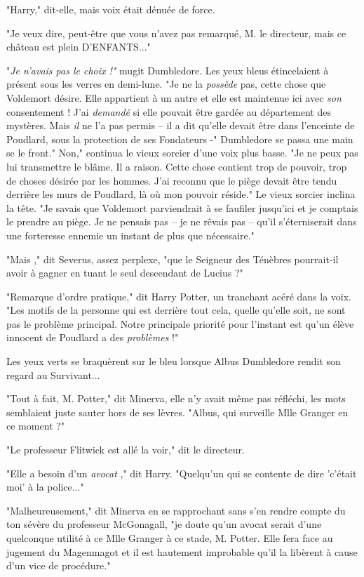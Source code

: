 "Harry," dit-elle, mais voix était dénuée de force.

"Je veux dire, peut-être que vous n'avez pas remarqué, M. le directeur, mais ce château est plein D'ENFANTS..."

"\emph{Je n'avais pas le choix !"}  mugit Dumbledore. Les yeux bleus étincelaient à présent sous les verres en demi-lune. "Je ne la \emph{possède}  pas, cette chose que Voldemort désire. Elle appartient à un autre et elle est maintenue ici avec \emph{son}  consentement ! J'ai \emph{demandé}  si elle pouvait être gardée au département des mystères. Mais \emph{il}  ne l'a pas permis – il a dit qu'elle devait être dans l'enceinte de Poudlard, sous la protection de ses Fondateurs -" Dumbledore se passa une main se le front." Non," continua le vieux sorcier d'une voix plus basse. "Je ne peux pas lui transmettre le blâme. Il a raison. Cette chose contient trop de pouvoir, trop de choses désirée par les hommes. J'ai reconnu que le piège devait être tendu derrière les murs de Poudlard, là où mon pouvoir réside." Le vieux sorcier inclina la tête. "Je savais que Voldemort parviendrait à se faufiler jusqu'ici et je comptais le prendre au piège. Je ne pensais pas – je ne rêvais pas – qu'il s'éterniserait dans une forteresse ennemie un instant de plus que nécessaire."

"Mais ," dit Severus, assez perplexe, "que le Seigneur des Ténèbres pourrait-il avoir à gagner en tuant le seul descendant de Lucius ?"

"Remarque d'ordre pratique," dit Harry Potter, un tranchant acéré dans la voix. "Les motifs de la personne qui est derrière tout cela, quelle qu'elle soit, ne sont pas le problème principal. Notre principale priorité pour l'instant est qu'un élève innocent de Poudlard a des \emph{problèmes } !"

Les yeux verts se braquèrent sur le bleu lorsque Albus Dumbledore rendit son regard au Survivant...

"Tout à fait, M. Potter," dit Minerva, elle n'y avait même pas réfléchi, les mots semblaient juste sauter hors de ses lèvres. "Albus, qui surveille Mlle Granger en ce moment ?"

"Le professeur Flitwick est allé la voir," dit le directeur.

"Elle a besoin d'un \emph{avocat} ," dit Harry. "Quelqu'un qui se contente de dire 'c'était moi' à la police..."

"Malheureusement," dit Minerva en se rapprochant sans s'en rendre compte du ton sévère du professeur McGonagall, "je doute qu'un avocat serait d'une quelconque utilité à ce Mlle Granger à ce stade, M. Potter. Elle fera face au jugement du Magenmagot et il est hautement improbable qu'il la libèrent à cause d'un vice de procédure."

